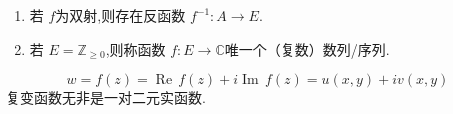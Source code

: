 \documentclass[../../复变函数.tex]{subfiles}
\begin{document}
\begin{remark}
    \begin{enumerate}
        \item 若 \(  f  \)为双射,则存在反函数 \(  f^{-1} :A\to E  \).  
        \item 若 \(  E= \mathbb{Z} _{\ge 0}  \),则称函数 \(  f:E\to \mathbb{C}   \)唯一个（复数）数列/序列.  
    \end{enumerate}
    
\end{remark}

\begin{example}
      \[
      w =  f\left( z \right)=  \operatorname{Re}\,f\left( z \right) +  i \operatorname{Im}\,f\left( z \right) =  u\left( x,y \right)+ iv\left( x,y \right)     
      \]复变函数无非是一对二元实函数.
\end{example}

\hspace*{\fill} 
\end{document}
